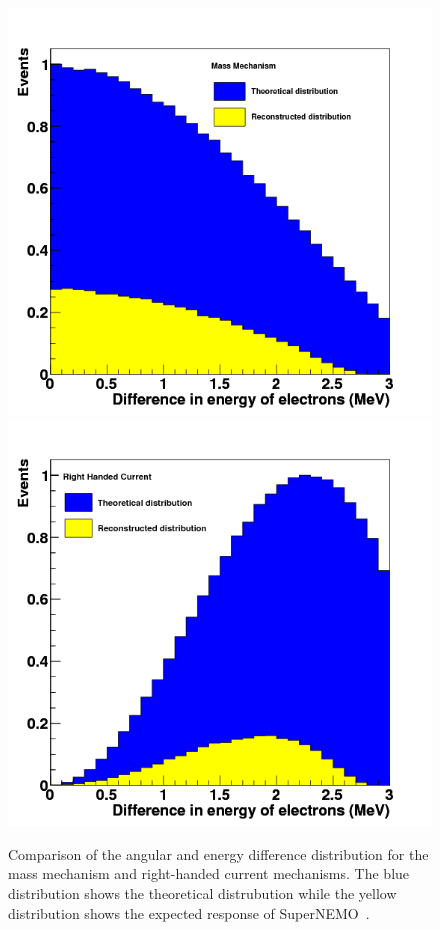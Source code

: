 \documentclass[main.tex]{subfiles}
\begin{document}
\begin{figure}[h!]
\begin{center}
\includegraphics[scale=0.3]{pictures/Chap2/MMenergy.png}
\includegraphics[scale=0.3]{pictures/Chap2/RHCenergy.png}
\caption{Comparison of the angular and energy difference distribution for the mass mechanism and right-handed current mechanisms. The blue distribution shows the theoretical distrubution while the yellow distribution shows the expected response of SuperNEMO~\cite{ProbingNewPhysicsSN}.}
\label{TopologyDifferenceNMM-RHC}
\end{center}
\end{figure}
\end{document}
